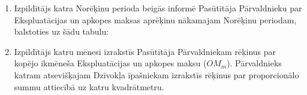 \begin{enumerate}[label=\arabic*.]
	\item Izpildītājs katra Norēķinu perioda beigās informē Pasūtītāja Pārvaldnieku par Ekspluatācijas un apkopes maksas aprēķinu nākamajam Norēķinu periodam, balstoties uz šādu tabulu:


\begin{center}
\end{center}

	\item Izpildītājs katru mēnesi izrakstīs Pasūtītāja Pārvaldniekam rēķinus par kopējo ikmēneša Ekspluatācijas un apkopes maksu ($OM_m$). Pārvaldnieks katram atsevišķajam Dzīvokļa īpašniekam izrakstīs rēķinus par proporcionālo summu attiecībā uz katru kvadrātmetru.

\end{enumerate}
